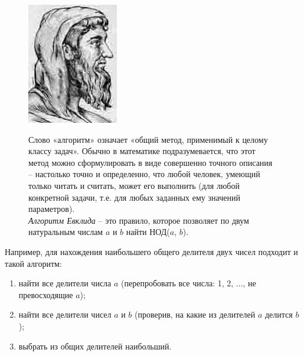 \begin{figure}[H]
\begin{minipage}{0.15\linewidth}
    \includegraphics[width=0.95\columnwidth]{img/11.2 img2.jpg}
\end{minipage}
\hfill
\begin{minipage}{0.85\linewidth}
    Слово «алгоритм» означает «общий метод, применимый к целому классу задач». Обычно в математике подразумевается, что этот метод можно сформулировать в виде совершенно точного описания -- настолько точно и определенно, что любой человек, умеющий только читать и считать, может его выполнить (для любой конкретной задачи, т.е. для любых заданных ему значений параметров).
    \\
    \textit{Алгоритм Евклида} -- это правило, которое позволяет по двум натуральным числам $a$ и $b$ найти НОД($a$, $b$).
\end{minipage}
\end{figure}

Например, для нахождения наибольшего общего делителя двух чисел подходит и такой алгоритм:
\begin{enumerate}[noitemsep]
    \item найти все делители числа $a$ (перепробовать все числа: 1, 2, ..., не превосходящие $a$);
    \item найти все делители чисел $a$ и $b$ (проверив, на какие из делителей $a$ делится $b$);
    \item выбрать из общих делителей наибольший.
\end{enumerate}

